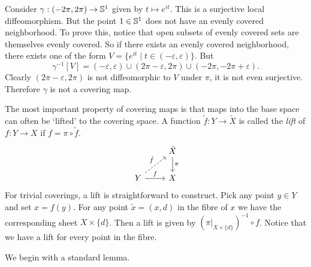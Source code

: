 \begin{example}
Consider $\gamma : (-2\pi, 2\pi) \to \mathbb{S}^1$ given by $t \mapsto e^{it}$.
This is a surjective local diffeomorphism.
But the point $1 \in \mathbb{S}^1$ does not have an evenly covered neighborhood.
To prove this, notice that open subsets of evenly covered sets are themselves evenly covered.
So if there exists an evenly covered neighborhood, there exists one of the form $V = \{ e^{it} \mid t \in (-\varepsilon,\varepsilon) \}$.
But 
\[
\gamma^{-1}[V] = (-\varepsilon,\varepsilon) \cup (2\pi - \varepsilon,2\pi) \cup (-2\pi,-2\pi+\varepsilon).
\]
Clearly $(2\pi - \varepsilon,2\pi)$ is not diffeomorphic to $V$ under $\pi$, it is not even surjective.
Therefore $\gamma$ is not a covering map.
\end{example}

The most important property of covering maps is that maps into the base space can often be `lifted' to the covering space.
A function $\tilde{f} : Y \to \tilde{X}$ is called the \emph{lift} of $f : Y \to X$ if $f = \pi \circ \tilde{f}$.
\[
\begin{tikzcd}
& \tilde{X} \arrow[d, "\pi"] \\
Y \arrow[r, "f"] \arrow[ru, dashed, "\tilde{f}"] & X
\end{tikzcd}
\]
For trivial coverings, a lift is straightforward to construct.
Pick any point $y \in Y$ and set $x = f(y)$.
For any point $\tilde{x} = (x,d)$ in the fibre of $x$ we have the corresponding sheet $X\times\{d\}$.
Then a lift is given by $(\pi|_{X\times\{d\}})^{-1} \circ f$.
Notice that we have a lift for every point in the fibre.

We begin with a standard lemma.

